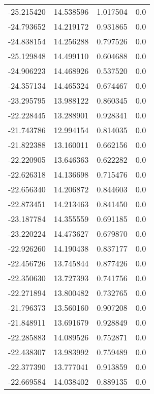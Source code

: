 \begin{tabular}{rrrr}
      -25.215420 &        14.538596 &    1.017504 &   0.0 \\
      -24.793652 &        14.219172 &    0.931865 &   0.0 \\
      -24.838154 &        14.256288 &    0.797526 &   0.0 \\
      -25.129848 &        14.499110 &    0.604688 &   0.0 \\
      -24.906223 &        14.468926 &    0.537520 &   0.0 \\
      -24.357134 &        14.465324 &    0.674467 &   0.0 \\
      -23.295795 &        13.988122 &    0.860345 &   0.0 \\
      -22.228445 &        13.288901 &    0.928341 &   0.0 \\
      -21.743786 &        12.994154 &    0.814035 &   0.0 \\
      -21.822388 &        13.160011 &    0.662156 &   0.0 \\
      -22.220905 &        13.646363 &    0.622282 &   0.0 \\
      -22.626318 &        14.136698 &    0.715476 &   0.0 \\
      -22.656340 &        14.206872 &    0.844603 &   0.0 \\
      -22.873451 &        14.213463 &    0.841450 &   0.0 \\
      -23.187784 &        14.355559 &    0.691185 &   0.0 \\
      -23.220224 &        14.473627 &    0.679870 &   0.0 \\
      -22.926260 &        14.190438 &    0.837177 &   0.0 \\
      -22.456726 &        13.745844 &    0.877426 &   0.0 \\
      -22.350630 &        13.727393 &    0.741756 &   0.0 \\
      -22.271894 &        13.800482 &    0.732765 &   0.0 \\
      -21.796373 &        13.560160 &    0.907208 &   0.0 \\
      -21.848911 &        13.691679 &    0.928849 &   0.0 \\
      -22.285883 &        14.089526 &    0.752871 &   0.0 \\
      -22.438307 &        13.983992 &    0.759489 &   0.0 \\
      -22.377390 &        13.777041 &    0.913859 &   0.0 \\
      -22.669584 &        14.038402 &    0.889135 &   0.0 \\

\end{tabular}
